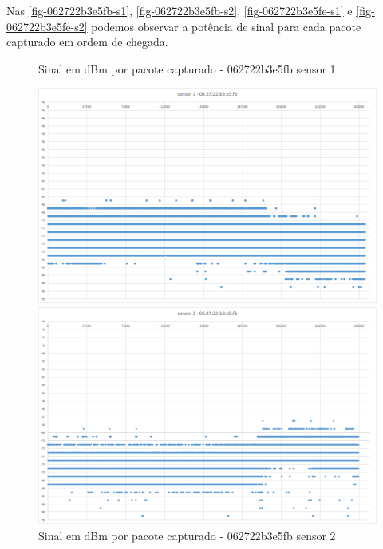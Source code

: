 Nas \autoref{fig-062722b3e5fb-s1}, \autoref{fig-062722b3e5fb-s2},
\autoref{fig-062722b3e5fe-s1} e \autoref{fig-062722b3e5fe-s2} podemos observar
a potência de sinal para cada pacote capturado em ordem de chegada.

\begin{figure}[htb]
	\begin{minipage}{0.49\textwidth}
	\centering
		\caption{\label{fig-062722b3e5fb-s1}Sinal em dBm por pacote capturado - 062722b3e5fb sensor 1}
		\includegraphics[width=1\textwidth]{060-testes/data-analisis/night-run/062722b3e5fb-sensor-01.png}
	\end{minipage}
\hfill
	\begin{minipage}{0.49\textwidth}
	\centering
		\caption{\label{fig-062722b3e5fb-s2}Sinal em dBm por pacote capturado - 062722b3e5fb sensor 2}
		\includegraphics[width=1\textwidth]{060-testes/data-analisis/night-run/062722b3e5fb-sensor-02.png}

\end{minipage}
\end{figure}
